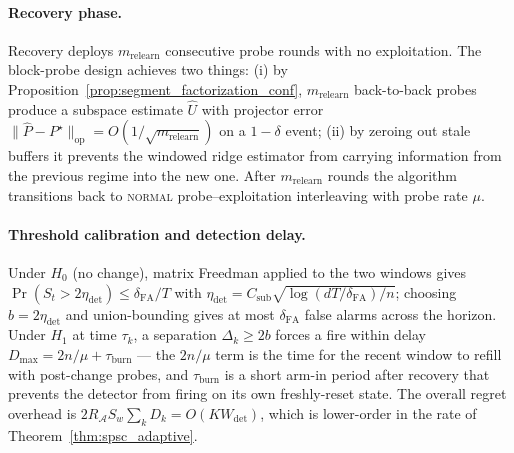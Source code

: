 \documentclass{article}
\newcommand{\op}{\mathrm{op}}
\newcommand{\cA}{\mathcal{A}}
\begin{document}
\paragraph{Recovery phase.}
Recovery deploys $m_{\mathrm{relearn}}$ consecutive probe rounds with
no exploitation. The block-probe design achieves two things: (i) by
Proposition~\ref{prop:segment_factorization_conf}, $m_{\mathrm{relearn}}$
back-to-back probes produce a subspace estimate $\widehat U$ with
projector error
$\|\widehat P - P^\star\|_\op = O(1/\sqrt{m_{\mathrm{relearn}}})$ on a
$1-\delta$ event; (ii) by zeroing out stale buffers it prevents the
windowed ridge estimator from carrying information from the previous
regime into the new one. After $m_{\mathrm{relearn}}$ rounds the
algorithm transitions back to \textsc{normal} probe--exploitation
interleaving with probe rate $\mu$.

\paragraph{Threshold calibration and detection delay.}
Under $H_0$ (no change), matrix Freedman applied to the two windows
gives $\Pr(S_t > 2\eta_{\mathrm{det}}) \le \delta_{\mathrm{FA}}/T$ with
$\eta_{\mathrm{det}} = C_{\mathrm{sub}}\sqrt{\log(dT/\delta_{\mathrm{FA}})/n}$;
choosing $b = 2\eta_{\mathrm{det}}$ and union-bounding gives at most
$\delta_{\mathrm{FA}}$ false alarms across the horizon. Under $H_1$ at
time $\tau_k$, a separation $\Delta_k \ge 2b$ forces a fire within
delay $D_{\max} = 2n/\mu + \tau_{\mathrm{burn}}$ — the $2n/\mu$ term is
the time for the recent window to refill with post-change probes, and
$\tau_{\mathrm{burn}}$ is a short arm-in period after recovery that
prevents the detector from firing on its own freshly-reset state.
The overall regret overhead is $2R_\cA S_w\sum_k D_k = O(K
W_{\mathrm{det}})$, which is lower-order in the rate of
Theorem~\ref{thm:spsc_adaptive}.
\end{document}
